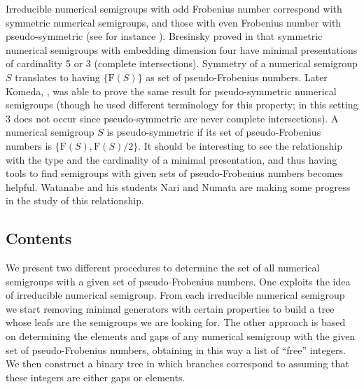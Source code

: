 \documentclass[11pt]{amsart}
\theoremstyle{remark}
\begin{document}
Irreducible numerical semigroups with odd  Frobenius number correspond with symmetric numerical semigroups, and those with even Frobenius number with pseudo-symmetric (see for instance  \cite[Chapter 3]{NS}).  Bresinsky proved in \cite{bres-sym} that symmetric numerical semigroups with embedding dimension four have minimal presentations of cardinality 5 or 3 (complete intersections). Symmetry of a numerical semigroup $S$ translates to having $\{\mathrm F(S)\}$ as set of pseudo-Frobenius numbers. Later Komeda, \cite{komeda}, was able to prove the same result for pseudo-symmetric numerical semigroups (though he used different terminology for this property; in this setting 3 does not occur since pseudo-symmetric are never complete intersections). A numerical semigroup $S$ is pseudo-symmetric if its set of pseudo-Frobenius numbers is $\{\mathrm F(S), \mathrm F(S)/2\}$. It should be interesting to see the relationship with the type and the cardinality of a minimal presentation, and thus having tools to find semigroups with given sets of pseudo-Frobenius numbers becomes helpful. Watanabe and his students Nari and Numata are making some progress in the study of this relationship.

\subsection{Contents}
\label{subsec:organization}

We present two different procedures to determine the set of all numerical semigroups with a given set of pseudo-Frobenius numbers. One exploits the idea of irreducible numerical semigroup. From each irreducible numerical semigroup we start removing minimal generators with certain properties to build a tree whose leafs are the semigroups we are looking for. The other approach is based on determining the elements and gaps of any numerical semigroup with the given set of pseudo-Frobenius numbers, obtaining in this way a list of ``free'' integers. We then construct a binary tree in which branches correspond to assuming that these integers are either gaps or elements.
\end{document}
